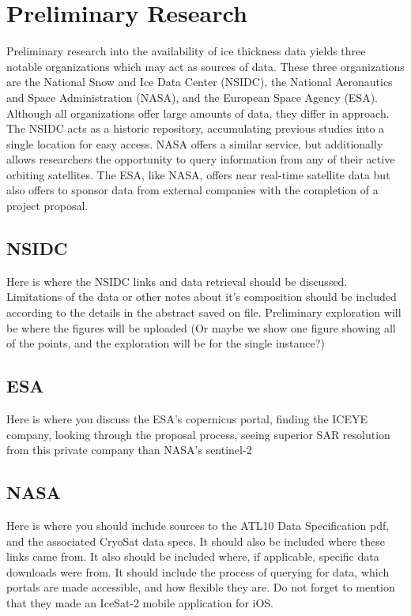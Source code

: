 \par

\section{Preliminary Research}
Preliminary research into the availability of ice thickness data yields three notable organizations which may act as sources of data. These three organizations are the National Snow and Ice Data Center (NSIDC), the National Aeronautics and Space Administration (NASA), and the European Space Agency (ESA). Although all organizations offer large amounts of data, they differ in approach. The NSIDC acts as a historic repository, accumulating previous studies into a single location for easy access. NASA offers a similar service, but additionally allows researchers the opportunity to query information from any of their active orbiting satellites. The ESA, like NASA, offers near real-time satellite data but also offers to sponsor data from external companies with the completion of a project proposal.

\subsection*{NSIDC}
Here is where the NSIDC links and data retrieval should be discussed. Limitations of the data or other notes about it's composition should be included according to the details in the abstract saved on file. Preliminary exploration will be where the figures will be uploaded (Or maybe we show one figure showing all of the points, and the exploration will be for the single instance?)

\subsection*{ESA}
Here is where you discuss the ESA's copernicus portal, finding the ICEYE company, looking through the proposal process, seeing superior SAR resolution from this private company than NASA's sentinel-2

\subsection*{NASA}
Here is where you should include sources to the ATL10 Data Specification pdf, and the associated CryoSat data specs. It should also be included where these links came from. It also should be included where, if applicable, specific data downloads were from. It should include the process of querying for data, which portals are made accessible, and how flexible they are. Do not forget to mention that they made an IceSat-2 mobile application for iOS. \cite{ICESat-2-ATL10-Product}

